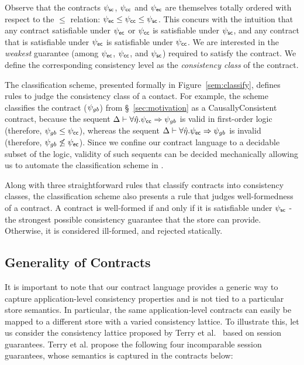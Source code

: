Observe that the contracts $\psi_{\sf sc}$, $\psi_{\sf cc}$ and $\psi_{\sf ec}$ are themselves totally
ordered with respect to the $\le$ relation: $\psi_{\sf ec} \le \psi_{\sf cc} \le \psi_{\sf sc}$.  This
concurs with the intuition that any contract satisfiable under $\psi_{\sf ec}$ or $\psi_{\sf cc}$
is satisfiable under $\psi_{\sf sc}$, and any contract that is satisfiable under $\psi_{\sf ec}$
is satisfiable under $\psi_{\sf cc}$. We are interested in the \emph{weakest} guarantee
(among $\psi_{\sf ec}$, $\psi_{\sf cc}$, and $\psi_{\sf sc}$) required to satisfy the contract. We define
the corresponding consistency level as the \emph{consistency class} of the
contract.

The classification scheme, presented formally in Figure~\ref{sem:classify},
defines rules to judge the consistency class of a contact. For example, the
scheme classifies the  contract ($\psi_{gb}$) from
\S~\ref{sec:motivation} as a {\sf\small CausallyConsistent} contract, because
the sequent $\Delta \vdash \forall \hat{\eta}. \psi_{\sf cc} \Rightarrow \psi_{gb}$ is valid
in first-order logic (therefore, $\psi_{gb} \le \psi_{\sf cc}$), whereas the sequent
$\Delta \vdash \forall \hat{\eta}. \psi_{\sf ec} \Rightarrow \psi_{gb}$ is invalid
(therefore, $\psi_{gb} \not\le \psi_{\sf ec}$). Since we confine our contract language to
a decidable subset of the logic, validity of such sequents can be decided
mechanically allowing us to automate the classification scheme in \name.

Along with three straightforward rules that classify contracts into consistency
classes, the classification scheme also presents a rule that judges
well-formedness of a contract. A contract is well-formed if and only if it is
satisfiable under $\psi_{\sf sc}$ - the strongest possible consistency guarantee that
the store can provide. Otherwise, it is considered ill-formed, and rejected
statically.

\subsection{Generality of Contracts}

It is important to note that our contract language provides a generic way to
capture application-level consistency properties and is not tied to a
particular store semantics. In particular, the same application-level contracts
can easily be mapped to a different store with a varied consistency lattice. To
illustrate this, let us consider the consistency lattice proposed by Terry et
al.~\cite{Session} based on session guarantees. Terry et al. propose the
following four incomparable session guarantees, whose semantics is captured in
the contracts below:

